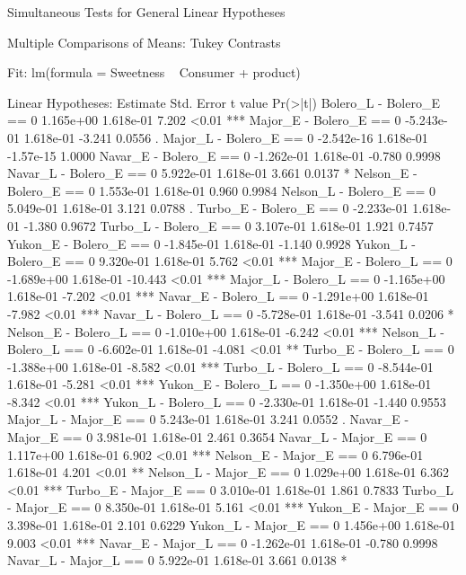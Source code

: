 
	 Simultaneous Tests for General Linear Hypotheses

Multiple Comparisons of Means: Tukey Contrasts


Fit: lm(formula = Sweetness ~ Consumer + product)

Linear Hypotheses:
                           Estimate Std. Error   t value Pr(>|t|)    
Bolero_L - Bolero_E == 0  1.165e+00  1.618e-01     7.202    <0.01 ***
Major_E - Bolero_E == 0  -5.243e-01  1.618e-01    -3.241   0.0556 .  
Major_L - Bolero_E == 0  -2.542e-16  1.618e-01 -1.57e-15   1.0000    
Navar_E - Bolero_E == 0  -1.262e-01  1.618e-01    -0.780   0.9998    
Navar_L - Bolero_E == 0   5.922e-01  1.618e-01     3.661   0.0137 *  
Nelson_E - Bolero_E == 0  1.553e-01  1.618e-01     0.960   0.9984    
Nelson_L - Bolero_E == 0  5.049e-01  1.618e-01     3.121   0.0788 .  
Turbo_E - Bolero_E == 0  -2.233e-01  1.618e-01    -1.380   0.9672    
Turbo_L - Bolero_E == 0   3.107e-01  1.618e-01     1.921   0.7457    
Yukon_E - Bolero_E == 0  -1.845e-01  1.618e-01    -1.140   0.9928    
Yukon_L - Bolero_E == 0   9.320e-01  1.618e-01     5.762    <0.01 ***
Major_E - Bolero_L == 0  -1.689e+00  1.618e-01   -10.443    <0.01 ***
Major_L - Bolero_L == 0  -1.165e+00  1.618e-01    -7.202    <0.01 ***
Navar_E - Bolero_L == 0  -1.291e+00  1.618e-01    -7.982    <0.01 ***
Navar_L - Bolero_L == 0  -5.728e-01  1.618e-01    -3.541   0.0206 *  
Nelson_E - Bolero_L == 0 -1.010e+00  1.618e-01    -6.242    <0.01 ***
Nelson_L - Bolero_L == 0 -6.602e-01  1.618e-01    -4.081    <0.01 ** 
Turbo_E - Bolero_L == 0  -1.388e+00  1.618e-01    -8.582    <0.01 ***
Turbo_L - Bolero_L == 0  -8.544e-01  1.618e-01    -5.281    <0.01 ***
Yukon_E - Bolero_L == 0  -1.350e+00  1.618e-01    -8.342    <0.01 ***
Yukon_L - Bolero_L == 0  -2.330e-01  1.618e-01    -1.440   0.9553    
Major_L - Major_E == 0    5.243e-01  1.618e-01     3.241   0.0552 .  
Navar_E - Major_E == 0    3.981e-01  1.618e-01     2.461   0.3654    
Navar_L - Major_E == 0    1.117e+00  1.618e-01     6.902    <0.01 ***
Nelson_E - Major_E == 0   6.796e-01  1.618e-01     4.201    <0.01 ** 
Nelson_L - Major_E == 0   1.029e+00  1.618e-01     6.362    <0.01 ***
Turbo_E - Major_E == 0    3.010e-01  1.618e-01     1.861   0.7833    
Turbo_L - Major_E == 0    8.350e-01  1.618e-01     5.161    <0.01 ***
Yukon_E - Major_E == 0    3.398e-01  1.618e-01     2.101   0.6229    
Yukon_L - Major_E == 0    1.456e+00  1.618e-01     9.003    <0.01 ***
Navar_E - Major_L == 0   -1.262e-01  1.618e-01    -0.780   0.9998    
Navar_L - Major_L == 0    5.922e-01  1.618e-01     3.661   0.0138 *  
